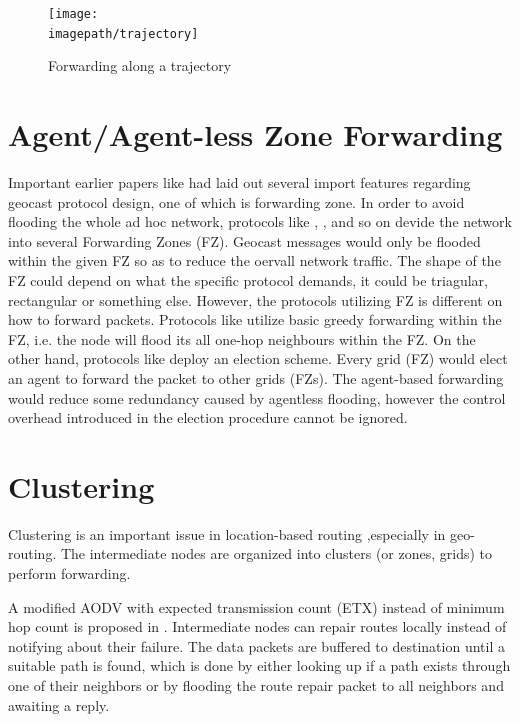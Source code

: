 \documentclass[conference]{IEEEtran}
\newcommand{\imagepath}{../../images/external/location_routing}
\begin{document}
\begin{figure}
\label{fig:trajectory}
\centering
\texttt{[image: \\imagepath/trajectory]}
\caption{Forwarding along a trajectory}
\end{figure}

\section{Agent/Agent-less Zone Forwarding}

Important earlier papers like \cite{Basagni1998} had laid out several import features regarding geocast protocol design, one of which is forwarding zone. In order to avoid flooding the whole ad hoc network, protocols like \cite{Basagni1998}, \cite{Camp2003}, \cite{Liao} and so on devide the network into several Forwarding Zones (FZ). Geocast messages would 
only be flooded within the given FZ so as to reduce the oervall network traffic. The shape of the FZ could depend on what the specific protocol demands, it could be triagular, rectangular or something else. However, the protocols utilizing FZ is different on how to forward packets. Protocols like \cite{Basagni1998} utilize basic greedy forwarding within
the FZ, i.e. the node will flood its all one-hop neighbours within the FZ. On the other hand, protocols like \cite{Liao} deploy an election scheme. Every grid (FZ) would elect an agent to forward the packet to other grids (FZs). The agent-based forwarding would reduce some redundancy caused by agentless flooding, however the control overhead 
introduced in the election procedure cannot be ignored.


\section{Clustering}
Clustering is an important issue in location-based routing ,especially in geo-routing. The intermediate nodes are organized into clusters (or zones, grids) to perform forwarding.

A modified AODV with expected transmission count (ETX) instead of minimum hop count is proposed in \cite{Al-Rabayah2010}.
Intermediate nodes can repair routes locally instead of notifying about their failure.
The data packets are buffered to destination until a suitable path is found, which is done by either looking up if a path exists through one of their neighbors or by flooding the route repair packet to all neighbors and awaiting a reply.
\end{document}
